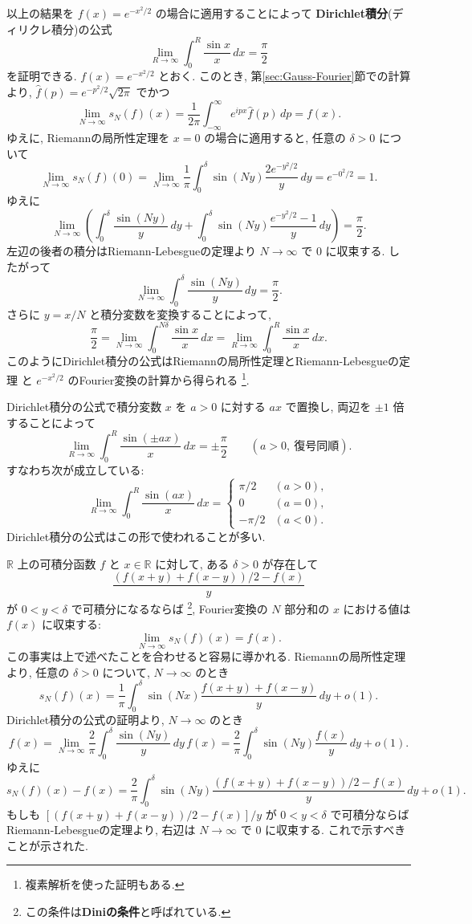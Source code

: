 \documentclass[12pt,twoside]{jarticle}
\newcommand\R{{\mathbb R}} %
\theoremstyle{jplain}
\theoremstyle{jplain}
\theoremstyle{jplain}
\numberwithin{theorem}{section}
\numberwithin{equation}{section}
\numberwithin{figure}{section}
\numberwithin{table}{section}
\newcommand\secref[1]{第\ref{#1}節}
\begin{document}
以上の結果を $f(x)=e^{-x^2/2}$ の場合に適用することによって
{\bf Dirichlet積分}(ディリクレ積分)の公式
\[
\lim_{R\to\infty}\int_0^R \frac{\sin x}{x}\,dx = \frac{\pi}{2}
\]
を証明できる. $f(x)=e^{-x^2/2}$ とおく.
このとき, \secref{sec:Gauss-Fourier}での計算より,
$\widehat{f}(p)=e^{-p^2/2}\sqrt{2\pi}$ でかつ
\[
\lim_{N\to\infty}s_N(f)(x)
= \frac{1}{2\pi}\int_{-\infty}^\infty e^{ipx}\widehat{f}(p)\,dp
= f(x).
\]
ゆえに, Riemannの局所性定理を $x=0$ の場合に適用すると,
任意の $\delta>0$ について
\[
\lim_{N\to\infty}s_N(f)(0)
=\lim_{N\to\infty}
\frac{1}{\pi}\int_0^\delta \sin(Ny)\frac{2e^{-y^2/2}}{y}\,dy
=e^{-0^2/2}=1.
\] 
ゆえに
\[
\lim_{N\to\infty}
\left(
 \int_0^\delta \frac{\sin(Ny)}{y}\,dy
 + \int_0^\delta \sin(Ny)\frac{e^{-y^2/2}-1}{y}\,dy
\right)
=\frac{\pi}{2}.
\]
左辺の後者の積分はRiemann-Lebesgueの定理より $N\to\infty$ で $0$ に収束する.
したがって
\[
\lim_{N\to\infty}\int_0^\delta \frac{\sin(Ny)}{y}\,dy = \frac{\pi}{2}.
\]
さらに $y=x/N$ と積分変数を変換することによって,
\[
\frac{\pi}{2}
=\lim_{N\to\infty}\int_0^{N\delta} \frac{\sin x}{x}\,dx
= \lim_{R\to\infty}\int_0^R \frac{\sin x}{x}\,dx.
\]
このようにDirichlet積分の公式はRiemannの局所性定理とRiemann-Lebesgueの定理
と $e^{-x^2/2}$ のFourier変換の計算から得られる%
\footnote{複素解析を使った証明もある.}.

Dirichlet積分の公式で積分変数 $x$ を $a>0$ に対する $ax$ で置換し, 
両辺を $\pm 1$ 倍することによって
\[
\lim_{R\to\infty}\int_0^R \frac{\sin(\pm ax)}{x}\,dx = \pm\frac{\pi}{2}
\qquad (a>0,\ \text{復号同順}).
\]
すなわち次が成立している:
\[
\lim_{R\to\infty}\int_0^R \frac{\sin(ax)}{x}\,dx
=
\begin{cases}
\pi/2  & (a>0), \\
0      & (a=0), \\
-\pi/2 & (a<0).
\end{cases}
\]
Dirichlet積分の公式はこの形で使われることが多い.

$\R$ 上の可積分函数 $f$ と $x\in\R$ に対して, 
ある $\delta>0$ が存在して
\[
\frac{(f(x+y)+f(x-y))/2-f(x)}{y}
\]
が $0<y<\delta$ で可積分になるならば%
\footnote{この条件は{\bf Diniの条件}と呼ばれている.}, 
Fourier変換の $N$ 部分和の $x$ における値は $f(x)$ に収束する:
\[
\lim_{N\to\infty} s_N(f)(x)=f(x).
\]
この事実は上で述べたことを合わせると容易に導かれる. 
Riemannの局所性定理より, 任意の $\delta>0$ について, 
$N\to\infty$ のとき 
\[
s_N(f)(x)
=\frac{1}{\pi}\int_0^\delta \sin(Nx)\frac{f(x+y)+f(x-y)}{y}\,dy+o(1).
\]
Dirichlet積分の公式の証明より, $N\to\infty$ のとき
\[
f(x)
= \lim_{N\to\infty} \frac{2}{\pi}\int_0^\delta \frac{\sin(Ny)}{y}\,dy\,f(x)
= \frac{2}{\pi}\int_0^\delta \sin(Ny) \frac{f(x)}{y}\,dy + o(1).
\]
ゆえに
\[
s_N(f)(x)-f(x)
=\frac{2}{\pi} \int_0^\delta
\sin(Ny)\frac{(f(x+y)+f(x-y))/2-f(x)}{y}\,dy
+o(1).
\]
もしも $[(f(x+y)+f(x-y))/2-f(x)]/y$ が $0<y<\delta$ で可積分ならば
Riemann-Lebesgueの定理より, 右辺は $N\to\infty$ で $0$ に収束する.
これで示すべきことが示された.
\end{document}
